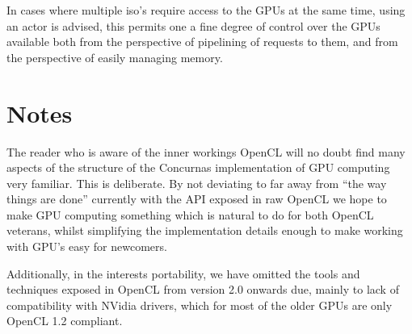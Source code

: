 \documentclass[conc-doc]{subfiles}
\begin{document}
In cases where multiple iso's require access to the GPUs at the same time, using an actor is advised, this permits one a fine degree of control over the GPUs available both from the perspective of pipelining of requests to them, and from the perspective of easily managing memory.

\section{Notes}
The reader who is aware of the inner workings OpenCL will no doubt find many aspects of the structure of the Concurnas implementation of GPU computing very familiar. This is deliberate. By not deviating to far away from “the way things are done” currently with the API exposed in raw OpenCL we hope to make GPU computing something which is natural to do for both OpenCL veterans, whilst simplifying the implementation details enough to make working with GPU's easy for newcomers.

Additionally, in the interests portability, we have omitted the tools and techniques exposed in OpenCL from version 2.0 onwards due, mainly to lack of compatibility with NVidia drivers, which for most of the older GPUs are only OpenCL 1.2 compliant.
\end{document}
